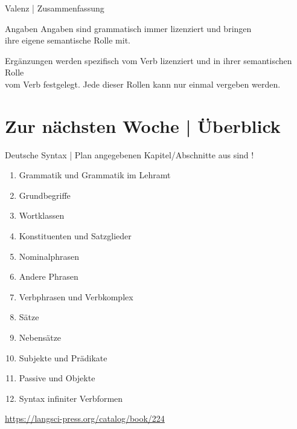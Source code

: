 \begin{frame}
  {Valenz | Zusammenfassung}
  \onslide<+->
  \onslide<+->
  \begin{block}{Angaben}
    \alert{Angaben} sind grammatisch immer lizenziert und bringen\\
    ihre eigene semantische Rolle mit.\\
    \Halbzeile
  \end{block}
  \Zeile
  \onslide<+->
  \begin{block}{Ergänzungen}
     werden spezifisch vom Verb lizenziert und in ihrer semantischen Rolle\\
    vom Verb festgelegt. Jede dieser Rollen kann nur einmal vergeben werden.
  \end{block}
\end{frame}




\ifdefined\TITLE
  \section{Zur nächsten Woche | Überblick}

  \begin{frame}
    {Deutsche Syntax | Plan}
     angegebenen Kapitel\slash Abschnitte aus  sind !\\
    \Halbzeile
    \begin{enumerate}
      \item Grammatik und Grammatik im Lehramt 
      \item Grundbegriffe 
      \item \alert{Wortklassen} 
      \item Konstituenten und Satzglieder 
      \item Nominalphrasen 
      \item Andere Phrasen 
      \item Verbphrasen und Verbkomplex 
      \item Sätze  
      \item Nebensätze 
      \item Subjekte und Prädikate 
      \item Passive und Objekte 
      \item Syntax infiniter Verbformen 
    \end{enumerate}
    \Halbzeile
    \centering 
    \url{https://langsci-press.org/catalog/book/224}
  \end{frame}
\fi
